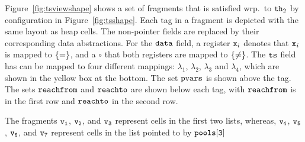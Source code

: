
Figure~\ref{fig:tsviewshape} shows a set of fragments that is
satisfied wrp.\ to ${\tt th}_2$ by configuration in Figure~\ref{fig:tsshape}.
Each tag in a fragment is depicted with the same layout as heap cells.
The non-pointer fields are replaced by their corresponding data abstractions. 
For the $\tt data$ field, a register $\mathtt{x}_i$ denotes that $\mathtt{x}_i$ is mapped to
$\left\{=\right\}$, and a $\circ$ that both registers are mapped to $\left\{\neq\right\}$.
The ${\tt ts}$ field has can be mapped to four different mappings: $\lambda_1$, $\lambda_2$, $\lambda_3$ and $\lambda_4$, which are shown in the
yellow box at the bottom.
The set $\mathtt{pvars}$ is shown above the tag.
The sets $\mathtt{reachfrom}$ and $\mathtt{reachto}$ are shown below each tag, with
$\mathtt{reachfrom}$ is in the first row and $\mathtt{reachto}$ in the second row.

The fragments $\tt v_1$, $\tt v_2$, and $\tt v_3$ represent cells
in the first two lists, whereas, $\tt v_4$, $\tt v_5$, $\tt v_6$, and $\tt v_7$
represent cells in the list pointed to by $\tt pools[3]$




